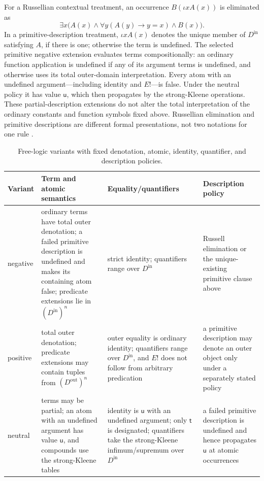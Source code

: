 For a Russellian contextual treatment, an occurrence
\(B(\iota xA(x))\) is eliminated as
\[
 \exists x\bigl(A(x)\land
   \forall y(A(y)\to y=x)\land B(x)\bigr).
\]
In a primitive-description treatment, \(\iota xA(x)\) denotes the unique
member of \(D^{\mathrm{in}}\) satisfying \(A\), if there is one; otherwise the
term is undefined. The selected primitive negative extension evaluates terms
compositionally: an ordinary function application is undefined if any of
its argument terms is undefined, and otherwise uses its total outer-domain
interpretation. Every atom with an undefined argument---including identity
and \(E!\)---is false. Under the
neutral policy it has value \(\mathsf u\), which then propagates by the
strong-Kleene operations.  These partial-description extensions do not alter
the total interpretation of the ordinary constants and function symbols fixed
above.  Russellian elimination and primitive descriptions are different formal
presentations, not two notations for one rule
\cite{Russell1905,Lehmann2002}.

\begin{table}[htbp]
\centering
\begin{tabularx}{\textwidth}{@{}l X X X@{}}
\toprule
Variant & Term and atomic semantics & Equality/quantifiers & Description policy \\
\midrule
negative & ordinary terms have total outer denotation; a failed primitive
description is undefined and makes its containing atom false; predicate
extensions lie in \((D^{\mathrm{in}})^n\) & strict
identity; quantifiers range over \(D^{\mathrm{in}}\) & Russell elimination or
the unique-existing primitive clause above \\
positive & total outer denotation; predicate extensions may contain tuples from
\((D^{\mathrm{out}})^n\) & outer equality is ordinary identity; quantifiers
range over \(D^{\mathrm{in}}\), and \(E!\) does not follow from arbitrary
predication & a primitive
description may denote an outer object only under a separately stated policy \\
neutral & terms may be partial; an atom with an undefined argument has value
\(\mathsf u\), and compounds use the strong-Kleene tables & identity is
\(\mathsf u\) with an undefined argument; only \(\mathsf t\) is designated;
quantifiers take the strong-Kleene infimum/supremum over
\(D^{\mathrm{in}}\) & a failed primitive description is undefined and hence
propagates \(\mathsf u\) at atomic occurrences \\
\bottomrule
\end{tabularx}
\caption{Free-logic variants with fixed denotation, atomic, identity,
quantifier, and description policies.}
\label{tab:p08-free-logic-variants}
\end{table}

